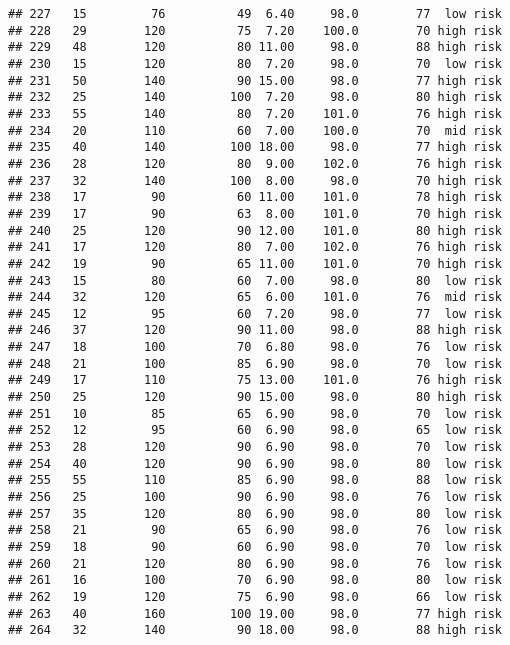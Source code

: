 \documentclass[
  ignorenonframetext,
]{beamer}
\begin{document}
\begin{frame}[fragile]
\begin{verbatim}
## 227   15         76          49  6.40     98.0        77  low risk
## 228   29        120          75  7.20    100.0        70 high risk
## 229   48        120          80 11.00     98.0        88 high risk
## 230   15        120          80  7.20     98.0        70  low risk
## 231   50        140          90 15.00     98.0        77 high risk
## 232   25        140         100  7.20     98.0        80 high risk
## 233   55        140          80  7.20    101.0        76 high risk
## 234   20        110          60  7.00    100.0        70  mid risk
## 235   40        140         100 18.00     98.0        77 high risk
## 236   28        120          80  9.00    102.0        76 high risk
## 237   32        140         100  8.00     98.0        70 high risk
## 238   17         90          60 11.00    101.0        78 high risk
## 239   17         90          63  8.00    101.0        70 high risk
## 240   25        120          90 12.00    101.0        80 high risk
## 241   17        120          80  7.00    102.0        76 high risk
## 242   19         90          65 11.00    101.0        70 high risk
## 243   15         80          60  7.00     98.0        80  low risk
## 244   32        120          65  6.00    101.0        76  mid risk
## 245   12         95          60  7.20     98.0        77  low risk
## 246   37        120          90 11.00     98.0        88 high risk
## 247   18        100          70  6.80     98.0        76  low risk
## 248   21        100          85  6.90     98.0        70  low risk
## 249   17        110          75 13.00    101.0        76 high risk
## 250   25        120          90 15.00     98.0        80 high risk
## 251   10         85          65  6.90     98.0        70  low risk
## 252   12         95          60  6.90     98.0        65  low risk
## 253   28        120          90  6.90     98.0        70  low risk
## 254   40        120          90  6.90     98.0        80  low risk
## 255   55        110          85  6.90     98.0        88  low risk
## 256   25        100          90  6.90     98.0        76  low risk
## 257   35        120          80  6.90     98.0        80  low risk
## 258   21         90          65  6.90     98.0        76  low risk
## 259   18         90          60  6.90     98.0        70  low risk
## 260   21        120          80  6.90     98.0        76  low risk
## 261   16        100          70  6.90     98.0        80  low risk
## 262   19        120          75  6.90     98.0        66  low risk
## 263   40        160         100 19.00     98.0        77 high risk
## 264   32        140          90 18.00     98.0        88 high risk

\end{verbatim}
\end{frame}
\end{document}
